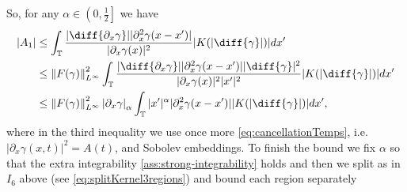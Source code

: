 \documentclass[a4paper]{amsart}
\theoremstyle{definition}
\newcommand{\T}{\ensuremath{\mathbb{T}}}
\newcommand{\SNa}[2][\gamma]{\ensuremath{\left|#2\right|_{#1}}}
\newcommand{\Np}[2][\infty]{\ensuremath{\left\|#2\right\|_{L^#1}}}
\newcommand{\intT}{\ensuremath{\int_\T}}
\begin{document}
    So, for any $\alpha\in\left(0,\frac{1}{2}\right]$ we have
    \begin{align*}
        |A_{1}|&\leq\intT \frac{|\diff{\partial_x \gamma}||\partial_x^2\gamma (x-x')|}{|\partial_x\gamma(x)|^2} |K(|\diff{\gamma}|)|dx'\\
        & \leq \Np{F(\gamma)}^2 \intT \frac{|\diff{\partial_x \gamma}||\partial_x^2\gamma (x-x')||\diff{\gamma}|^2}{|\partial_x\gamma(x)|^2|x'|^2} |K(|\diff{\gamma}|)|dx' \\
        &\leq \Np{F(\gamma)}^2 \SNa[\alpha]{\partial_x\gamma}\intT |x'|^\alpha |\partial_x^2\gamma (x-x')||K(|\diff{\gamma}|)|dx',
    \end{align*}
     where in the third inequality we use once more \eqref{eq:cancellationTemps}, i.e. $|\partial_x\gamma(x,t)|^2=A(t)$, and Sobolev embeddings. To finish the bound we fix $\alpha$ so that the extra integrability \eqref{ass:strong-integrability} holds and then we split as in $I_6$ above (see \eqref{eq:splitKernel3regions}) and bound each region separately
\end{document}
